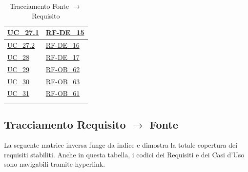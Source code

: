 \begin{longtable}{|>{\raggedright}p{}|>{\raggedright\arraybackslash}p{}|}
    \hline
    \hyperref[uc_27.1]{UC\_27.1} & \hyperlink{rf-de_15}{RF-DE\_15} \\
    \hline
    \hyperref[uc_27.2]{UC\_27.2} & \hyperlink{rf-de_16}{RF-DE\_16} \\
    \hline
    \hyperref[uc_28]{UC\_28} & \hyperlink{rf-de_17}{RF-DE\_17} \\
    \hline
    \hyperref[uc_29]{UC\_29} & \hyperlink{rf-ob_62}{RF-OB\_62} \\
    \hline
    \hyperref[uc_30]{UC\_30} & \hyperlink{rf-ob_63}{RF-OB\_63} \\
    \hline
    \hyperref[uc_31]{UC\_31} & \hyperlink{rf-ob_61}{RF-OB\_61} \\
    \hline
    \caption{Tracciamento Fonte $\rightarrow$ Requisito}
\end{longtable}


\newpage
\subsection{Tracciamento Requisito $\rightarrow$ Fonte}
La seguente matrice inversa funge da indice e dimostra la totale copertura dei requisiti stabiliti. Anche in questa tabella, i codici dei Requisiti e dei Casi d'Uso sono navigabili tramite hyperlink.

